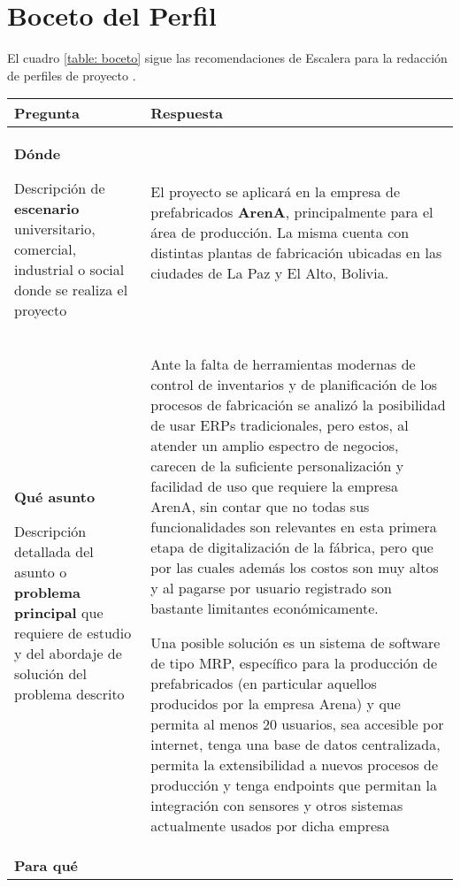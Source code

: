 \section{Boceto del Perfil}

El cuadro \ref{table: boceto} sigue las recomendaciones de Escalera para la redacción de perfiles de proyecto \cite{escaleraTECNICASIDCIENCIAS2006}.

\begin{table}[htbp]
	\centering
	\begin{tabular}{p{}p{}}\toprule
		Pregunta & Respuesta \\ \midrule
		\textbf{Dónde}

		{\tiny Descripción de \textbf{escenario} universitario, comercial, industrial o social donde se realiza el proyecto} &

		El proyecto se aplicará en la empresa de prefabricados \mbox{\textbf{ArenA}}, principalmente para el área de producción. La misma cuenta con distintas plantas de fabricación ubicadas en las ciudades de La Paz y El Alto, Bolivia.\\

		\textbf{Qué asunto}

		{\tiny Descripción detallada del asunto o \textbf{problema principal} que requiere de estudio y del abordaje de solución del problema descrito} &

		Ante la falta de herramientas modernas de control de inventarios y de planificación de los procesos de fabricación se analizó la posibilidad de usar ERPs tradicionales, pero estos, al atender un amplio espectro de negocios, carecen de la suficiente personalización y facilidad de uso que requiere la empresa ArenA, sin contar que no todas sus funcionalidades son relevantes en esta primera etapa de digitalización de la fábrica, pero que por las cuales además los costos son muy altos y al pagarse por usuario registrado son bastante limitantes económicamente.

		Una posible solución es un sistema de software de tipo MRP, específico para la producción de prefabricados (en particular aquellos producidos por la empresa Arena) y que permita al menos 20 usuarios, sea accesible por internet, tenga una base de datos centralizada, permita la extensibilidad a nuevos procesos de producción y tenga endpoints que permitan la integración con sensores y otros sistemas actualmente usados por dicha empresa\\

		\textbf{Para qué}


\end{tabular}
\end{table}
